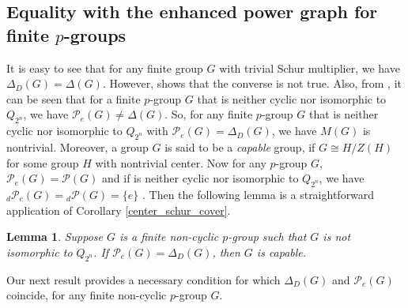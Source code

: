 \documentclass[12pt,a4paper]{article}
\newtheorem{lemma}[theorem]{Lemma}
\begin{document}
\subsection{Equality with the enhanced power graph for finite $p$-groups}

It is easy to see that for any finite group $G$ with trivial Schur multiplier, we have $\Delta_D(G)=\Delta(G)$. However, \cite[Example 3]{deepc} shows that the converse is not true. Also, from \cite[Theorem 30]{aa}, it can be seen that for a finite $p$-group $G$ that is neither cyclic nor isomorphic to $Q_{2^n}$, we have $\mathcal{P}_e(G)\neq\Delta(G)$. So, for any finite $p$-group $G$ that is neither cyclic nor isomorphic to $Q_{2^n}$ with $\mathcal{P}_e(G)=\Delta_D(G)$, we have $M(G)$ is nontrivial. Moreover, a group $G$ is said to be a \textit{capable} group, if $G\cong H/Z(H)$ for some group $H$ with nontrivial center. Now for any $p$-group $G$, $\mathcal{P}_e(G)=\mathcal{P}(G)$ \cite[Theorem 28]{aa} and if is neither cyclic nor isomorphic to $Q_{2^n}$, we have $_d\mathcal{P}_e(G)={_d}\mathcal{P}(G)=\{e\}$ \cite[Proposition 4]{cameron 2}. Then the following lemma is a straightforward application of Corollary \ref{center_schur_cover}. 

\begin{lemma}\label{capable}
Suppose $G$ is a finite non-cyclic $p$-group such that $G$ is not isomorphic to $Q_{2^n}$. If $\mathcal{P}_e(G)=\Delta_D(G)$, then $G$ is capable.
\end{lemma}

Our next result provides a necessary condition for which $\Delta_D(G)$ and $\mathcal{P}_e(G)$ coincide, for any finite non-cyclic $p$-group $G$.
\end{document}
